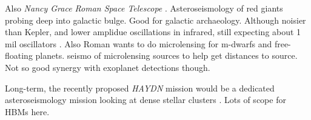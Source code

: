 Also \emph{Nancy Grace Roman Space Telescope} \citep[\emph{Roman}, formerly \emph{WFIRST};][]{Spergel.Gehrels.ea2015}. Asteroseismology of red giants probing deep into galactic bulge. Good for galactic archaeology. Although noisier than Kepler, and lower amplidue oscillations in infrared, still expecting about 1 mil oscillators \citep{Gould.Huber.ea2015}. Also Roman wants to do microlensing for m-dwarfs and free-floating planets. seismo of microlensing sources to help get distances to source. Not so good synergy with exoplanet detections though.

Long-term, the recently proposed \emph{HAYDN} mission would be a dedicated asteroseismology mission looking at dense stellar clusters \citep{Miglio.Girardi.ea2021}. Lots of scope for HBMs here.
